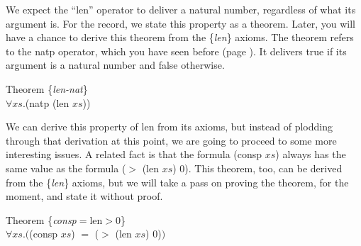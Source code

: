 \begin{comment}
We also expect the ``len'' operator to deliver a natural number, regardless of what its argument is. We can state this in the form of a theorem using the ``natp'' operator, which delivers true if its argument is a natural number and false if it isn't.

\label{len-nat-thm}
\begin{lstlisting}
(defthmd len-is-natural-number-thm
  (natp (len xs)))
\end{lstlisting}

ACL2 succeeds in proving this theorem, too, so we now know that the formula (len $xs$) delivers a non-negative integer, regardless of what formula $xs$ stands for. We will use the label \{\emph{len-nat}\} when we cite this theorem in proofs.

A related fact is that the formula (consp $xs$) is logically equivalent to the formula (\verb+>+ (len $xs$) 0). In the notation from Chapter~\ref{ch:Boolean-Formulas}: (consp $xs$)$\leftrightarrow$(\verb+>+ (len $xs$) 0). The name of the equivalence operator in ACL2 is ``iff'', so in ACL2 notation, the formula would be:
(iff (consp $xs$) (\verb+>+ (len $xs$) 0)). Or, stated as a theorem, it looks like this:

\begin{lstlisting}
(defthmd consp<->len>0-thm
  (iff (consp xs) (> (len xs) 0)))
\end{lstlisting}
\end{comment}

We expect the ``len'' operator to deliver a natural number, 
regardless of what its argument is.
For the record, we state this property as a theorem. 
Later, you will have a chance to derive this theorem from the \{\emph{len}\} axioms. 
The theorem refers to the natp operator, 
which you have seen before (page \pageref{natp-op}). 
It delivers true if its argument is a natural number and false otherwise.
\begin{center}
\label{len-nat-thm}
Theorem \{\emph{len-nat}\} \\
$\forall xs.$(natp (len $xs$))
\end{center}

We can derive this property of len from its axioms, 
but instead of plodding through that derivation at this point,
we are going to proceed to some more interesting issues. 
A related fact is that the formula (consp $xs$) always has the same value 
as the formula ($>$ (len $xs$) 0). %
This theorem, too, can be derived from the \{\emph{len}\} axioms, 
but we will take a pass on proving the theorem, for the moment, 
and state it without proof.
\begin{center}
\label{consp-len-thm}
Theorem \{\emph{consp}$=$len$>$0\} \\
$\forall xs.($(consp $xs$) $=$ ($>$ (len $xs$) 0)$)$
\end{center}

